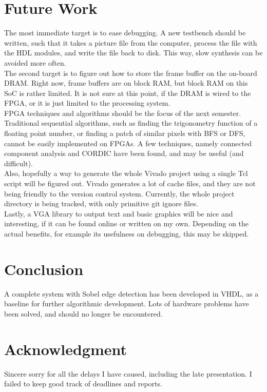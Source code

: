 \documentclass{article}
\begin{document}
	\section{Future Work}
	The most immediate target is to ease debugging. A new testbench should be written, such that it takes a picture file from the computer, process the file with the HDL modules, and write the file back to disk. This way, slow synthesis can be avoided more often.
	\\
	
	The second target is to figure out how to store the frame buffer on the on-board DRAM. Right now, frame buffers are on block RAM, but block RAM on this SoC is rather limited. It is not sure at this point, if the DRAM is wired to the FPGA, or it is just limited to the processing system.
	\\
	
	FPGA techniques and algorithms should be the focus of the next semester. Traditional sequential algorithms, such as finding the trigonometry function of a floating point number, or finding a patch of similar pixels with BFS or DFS, cannot be easily implemented on FPGAs. A few techniques, namely connected component analysis \cite{cca} and CORDIC have been found, and may be useful (and difficult).
	\\
	
	Also, hopefully a way to generate the whole Vivado project using a single Tcl script will be figured out. Vivado generates a lot of cache files, and they are not being friendly to the version control system. Currently, the whole project directory is being tracked, with only primitive git ignore files.
	\\
	
	Lastly, a VGA library to output text and basic graphics will be nice and interesting, if it can be found online or written on my own. Depending on the actual benefits, for example its usefulness on debugging, this may be skipped.
	\newpage\section{Conclusion}
	A complete system with Sobel edge detection has been developed in VHDL, as a baseline for further algorithmic development. Lots of hardware problems have been solved, and should no longer be encountered.
	\section{Acknowledgment}
		Sincere sorry for all the delays I have caused, including the late presentation. I failed to keep good track of deadlines and reports.
	\\
		
\end{document}
